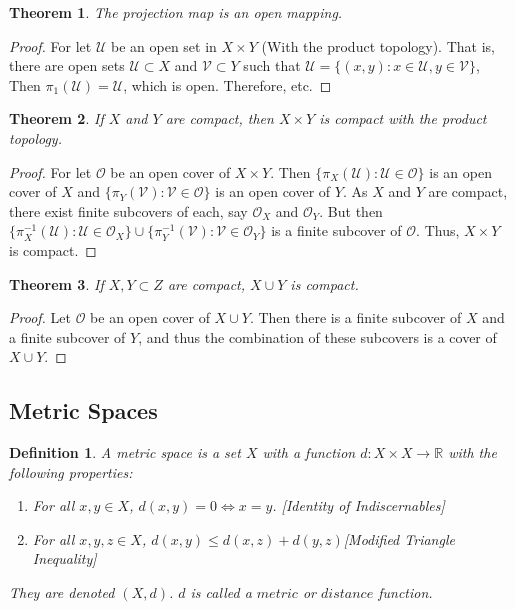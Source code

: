 \documentclass[12pt,oneside]{book}
\theoremstyle{mystyle}
\newtheorem{theorem}{Theorem}[section]
\newtheorem{definition}{Definition}[section]
\begin{document}
\begin{theorem}
The projection map is an open mapping.
\end{theorem}
\begin{proof}
For let $\mathscr{U}$ be an open set in $X\times Y$ (With the product topology). That is, there are open sets $\mathcal{U}\subset X$ and $\mathcal{V}\subset Y$ such that $\mathscr{U}= \{(x,y):x\in \mathcal{U},y\in \mathcal{V}\}$, Then $\pi_1(\mathscr{U}) =\mathcal{U}$, which is open. Therefore, etc.
\end{proof}

\begin{theorem}
If $X$ and $Y$ are compact, then $X\times Y$ is compact with the product topology.
\end{theorem}
\begin{proof}
For let $\mathscr{O}$ be an open cover of $X\times Y$. Then $\{\pi_X(\mathscr{U}):\mathscr{U}\in \mathscr{O}\}$ is an open cover of $X$ and $\{\pi_{Y}(\mathscr{V}):\mathscr{V}\in \mathscr{O}\}$ is an open cover of $Y$. As $X$ and $Y$ are compact, there exist finite subcovers of each, say $\mathcal{O}_X$ and $\mathcal{O}_Y$. But then $\{\pi_{X}^{-1}(\mathcal{U}):\mathcal{U}\in \mathcal{O}_X\}\cup \{\pi_{Y}^{-1}(\mathcal{V}):\mathcal{V}\in \mathcal{O}_Y\}$ is a finite subcover of $\mathscr{O}$. Thus, $X\times Y$ is compact.
\end{proof}

\begin{theorem}
If $X,Y\subset Z$ are compact, $X\cup Y$ is compact.
\end{theorem}
\begin{proof}
Let $\mathcal{O}$ be an open cover of $X\cup Y$. Then there is a finite subcover of $X$ and a finite subcover of $Y$, and thus the combination of these subcovers is a cover of $X\cup Y$.
\end{proof}
%
\subsection{Metric Spaces}
%
\begin{definition}
A metric space is a set $X$ with a function $d:X\times X\rightarrow \mathbb{R}$ with the following properties:
\begin{enumerate}
\item For all $x,y\in X$, $d(x,y) = 0\Leftrightarrow x=y$. \hfill [Identity of Indiscernables]
\item For all $x,y,z\in X$, $d(x,y) \leq d(x,z)+d(y,z)$\hfill [Modified Triangle Inequality]
\end{enumerate}
They are denoted $(X,d)$. $d$ is called a $metric$ or $distance$ function.
\end{definition}
\end{document}
